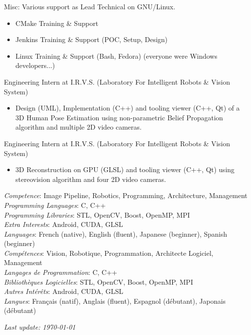\documentclass{article}
\begin{document}
\begin{llist}
{Misc:
Various support as Lead Technical on GNU/Linux.
\begin{itemize}
\item CMake Training \& Support
\item Jenkins Training \& Support (POC, Setup, Design)
\item Linux Training \& Support (Bash, Fedora) (everyone were Windows developers...)
\end{itemize}
} {}

 {
Engineering Intern at I.R.V.S. (Laboratory For Intelligent Robots \& Vision System)
\vspace{-0.33cm}
\begin{itemize}
\item Design (UML), Implementation (C++) and tooling viewer (C++, Qt) of a
3D Human Pose Estimation using non-parametric Belief Propagation
algorithm and multiple 2D video cameras.
\end{itemize}
} {}

 {
Engineering Intern at I.R.V.S. (Laboratory For Intelligent Robots \& Vision System)
\vspace{-0.33cm}
\begin{itemize}
\item 3D Reconstruction on GPU (GLSL) and tooling viewer (C++, Qt) using stereovision algorithm and four 2D video cameras.
\end{itemize}
} {}

 {
{\em Competence}: Image Pipeline, Robotics, Programming, Architecture, Management \\
{\em Programming Languages}: C, C++ \\
{\em Programming Libraries}: STL, OpenCV, Boost, OpenMP, MPI \\
{\em Extra Interests}: Android, CUDA, GLSL \\
{\em Languages}: French (native), English (fluent), Japanese (beginner), Spanish
(beginner) \\
} {
{\em Comp\'{e}tences}: Vision, Robotique, Programmation, Architecte Logiciel,
Management \\
{\em Langages de Programmation}: C, C++ \\
{\em Biblioth\`{e}ques Logicielles}: STL, OpenCV, Boost, OpenMP, MPI \\
{\em Autres Int\'{e}r\^{e}ts}: Android, CUDA, GLSL \\
{\em Langues}: Fran\c{c}ais (natif), Anglais (fluent), Espagnol (d\'{e}butant),
Japonais (d\'{e}butant) \\
}


\end{llist}

{\em Last update: \today}
\end{document}
